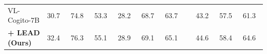 \begin{table}[h]
{\begin{tabular}{l|lllllll|lll}
        VL-Cogito-7B & 30.7 & 74.8 & 53.3 & 28.2 & 68.7 & 63.7 & & 43.2 & 57.5 & 61.3 \\
        \rowcolor{gray!20}
        \textbf{+ LEAD (Ours)} &
        32.4~\color{blue!60}{(+1.7)} & 76.3~\color{blue!60}{(+1.5)} & 55.1~\color{blue!60}{(+1.8)} &
        28.9~\color{blue!60}{(+0.7)} & 69.1~\color{blue!60}{(+0.4)} & 65.1~\color{blue!60}{(+1.4)} & &
        44.6~\color{blue!60}{(+1.4)} & 58.4~\color{blue!60}{(+0.9)} & 64.6~\color{blue!60}{(+3.3)} \\
        \hline
    \end{tabular}}
    \vspace{-0.2cm}
\end{table}

